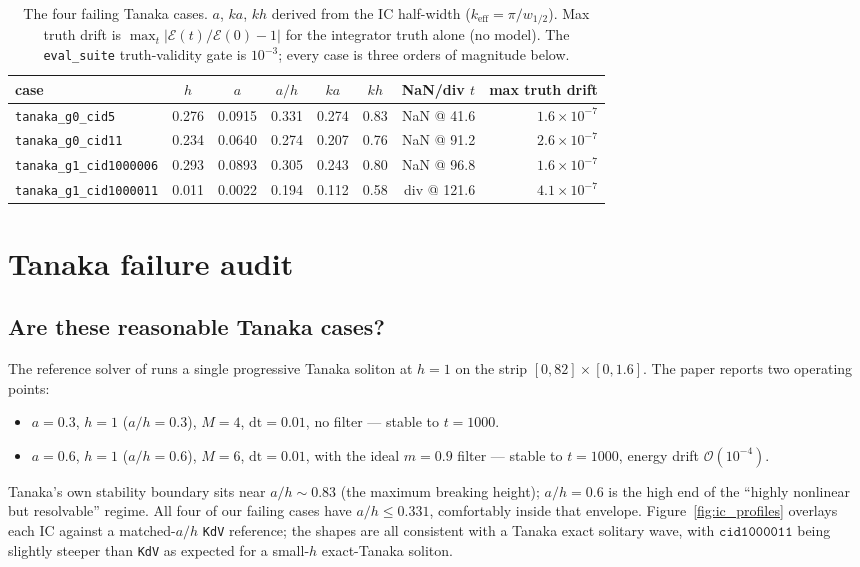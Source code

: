 \documentclass[11pt,letterpaper]{article}
\begin{document}
\begin{table}[h]
\centering
\small
\begin{tabular}{lcccccrr}
\toprule
case & $h$ & $a$ & $a/h$ & $ka$ & $kh$ & NaN/div $t$ & max truth drift \\
\midrule
\texttt{tanaka\_g0\_cid5}        & 0.276 & 0.0915 & 0.331 & 0.274 & 0.83 & NaN @ 41.6  & $1.6\!\times\!10^{-7}$ \\
\texttt{tanaka\_g0\_cid11}       & 0.234 & 0.0640 & 0.274 & 0.207 & 0.76 & NaN @ 91.2  & $2.6\!\times\!10^{-7}$ \\
\texttt{tanaka\_g1\_cid1000006}  & 0.293 & 0.0893 & 0.305 & 0.243 & 0.80 & NaN @ 96.8  & $1.6\!\times\!10^{-7}$ \\
\texttt{tanaka\_g1\_cid1000011}  & 0.011 & 0.0022 & 0.194 & 0.112 & 0.58 & div @ 121.6 & $4.1\!\times\!10^{-7}$ \\
\bottomrule
\end{tabular}
\caption{The four failing Tanaka cases. $a$, $ka$, $kh$ derived from the IC half-width
($k_{\mathrm{eff}}=\pi/w_{1/2}$). Max truth drift is
$\max_{t}|\mathcal{E}(t)/\mathcal{E}(0)-1|$ for the integrator truth alone (no model). The
\texttt{eval\_suite} truth-validity gate is $10^{-3}$; every case is three orders of
magnitude below.}
\label{tab:cases}
\end{table}

\section{Tanaka failure audit}

\subsection{Are these reasonable Tanaka cases?}

The reference solver of \cite{xu2009} runs a single progressive Tanaka soliton at $h=1$
on the strip $[0,82]\!\times\![0,1.6]$. The paper reports two operating points:
\begin{itemize}[leftmargin=1.4em,topsep=0pt,itemsep=2pt]
  \item $a=0.3$, $h=1$ ($a/h=0.3$), $M=4$, $\mathrm{dt}=0.01$, no filter --- stable to
        $t\!=\!1000$.
  \item $a=0.6$, $h=1$ ($a/h=0.6$), $M=6$, $\mathrm{dt}=0.01$, with the ideal $m=0.9$ filter
        --- stable to $t\!=\!1000$, energy drift $\mathcal{O}(10^{-4})$.
\end{itemize}
Tanaka's own stability boundary sits near $a/h\!\sim\!0.83$ (the maximum breaking
height); $a/h\!=\!0.6$ is the high end of the ``highly nonlinear but resolvable'' regime.
All four of our failing cases have $a/h\!\leq\!0.331$, comfortably inside that envelope.
Figure~\ref{fig:ic_profiles} overlays each IC against a matched-$a/h$ \texttt{KdV} reference;
the shapes are all consistent with a Tanaka exact solitary wave, with $\texttt{cid1000011}$
being slightly steeper than \texttt{KdV} as expected for a small-$h$ exact-Tanaka soliton.
\end{document}
